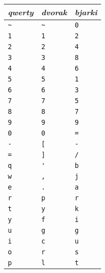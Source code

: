 \begin{minipage}{0.45\textwidth}
\begin{tabular}{|l|l|l|} \hline
\emph{qwerty} & \emph{dvorak} & \emph{bjarki} \\ \hline
\verb!~! & \verb!~! & \verb!0! \\
\verb!1! & \verb!1! & \verb!2! \\
\verb!2! & \verb!2! & \verb!4! \\
\verb!3! & \verb!3! & \verb!8! \\
\verb!4! & \verb!4! & \verb!6! \\
\verb!5! & \verb!5! & \verb!1! \\
\verb!6! & \verb!6! & \verb!3! \\
\verb!7! & \verb!7! & \verb!5! \\
\verb!8! & \verb!8! & \verb!7! \\
\verb!9! & \verb!9! & \verb!9! \\
\verb!0! & \verb!0! & \verb!=! \\
\verb!-! & \verb![! & \verb!-! \\
\verb!=! & \verb!]! & \verb!/! \\
\verb!q! & \verb!'! & \verb!b! \\
\verb!w! & \verb!,! & \verb!j! \\
\verb!e! & \verb!.! & \verb!a! \\
\verb!r! & \verb!p! & \verb!r! \\
\verb!t! & \verb!y! & \verb!k! \\
\verb!y! & \verb!f! & \verb!i! \\
\verb!u! & \verb!g! & \verb!g! \\
\verb!i! & \verb!c! & \verb!u! \\
\verb!o! & \verb!r! & \verb!s! \\
\verb!p! & \verb!l! & \verb!t! \\ \hline
\end{tabular}
\end{minipage}

